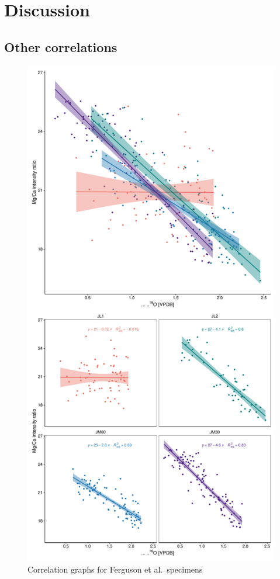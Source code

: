 \documentclass[
  authoryear,
  preprint,
  3p]{elsarticle}
\begin{document}
\section{Discussion}\label{discussion}

\subsection{Other correlations}\label{other-correlations}

\begin{figure}[H]

{\centering \includegraphics{Manuscript_files/figure-pdf/Ferguson Data-1.pdf}

}

\caption{Correlation graphs for Ferguson et al.~specimens}

\end{figure}%
\end{document}
